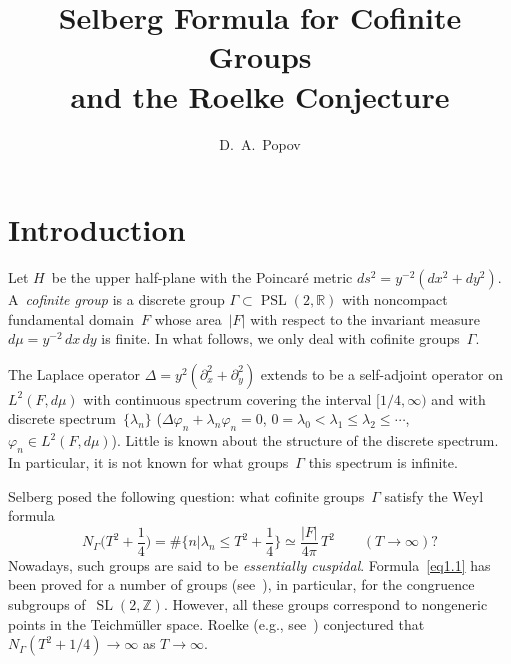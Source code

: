 \documentclass{amsart}
\theoremstyle{plain}
\theoremstyle{definition}
\numberwithin{equation}{section}
\begin{document}
\author[D.~A.~Popov]{D.~A.~Popov}

\title[Selberg Formula for Cofinite Groups]%
{Selberg Formula for Cofinite Groups\\ and the Roelke Conjecture}

\maketitle

\tableofcontents


\section{Introduction}
\label{sec1}

Let $H$~be the upper half-plane with the Poincar\'e metric
$ds^2=y^{-2}(dx^2+dy^2)$. A~\textit{cofinite group} is a discrete
group $\Gamma\subset\operatorname{PSL}(2,\mathbb{R})$ with
noncompact fundamental domain~$F$ whose area~$|F|$ with respect to
the invariant measure $d\mu=y^{-2}\,dx\,dy$ is finite. In what
follows, we only deal with cofinite groups~$\Gamma$.

The Laplace operator $\Delta=y^2(\partial_x^2+\partial_y^2)$
extends to be a self-adjoint operator on~$L^2(F,d\mu)$ with
continuous spectrum covering the interval $[1/4,\infty)$ and with
discrete spectrum~$\{\lambda_n\}$
($\Delta\varphi_n+\lambda_n\varphi_n=0$,
$0=\lambda_0<\lambda_1\leqslant\lambda_2\leqslant\cdots$,
$\varphi_n\in L^2(F,d\mu)$). Little is known about the structure of
the discrete spectrum. In particular, it is not known for what
groups~$\Gamma$ this spectrum is infinite.

Selberg posed the following question: what cofinite groups~$\Gamma$
satisfy the Weyl formula
\begin{equation}
\label{eq1.1}
N_\Gamma\biggl(T^2+\frac14\biggr)=\#\biggl\{n|\lambda_n\leqslant
T^2+\frac14\biggr\}\simeq \frac{|F|}{4\pi}\,T^2\qquad (T\to\infty)?
\end{equation}
Nowadays, such groups are said to be \textit{essentially cuspidal}.
Formula~\eqref{eq1.1} has been proved for a number of groups
(see~\cite{1,2,3,4}), in particular, for the congruence subgroups
of~$\operatorname{SL}(2,\mathbb{Z})$. However, all these groups
correspond to nongeneric points in the Teichm\"uller space. Roelke
(e.g., see~\cite{1}) conjectured that $N_\Gamma(T^2+1/4)\to\infty$
as $T\to\infty$.
\end{document}
